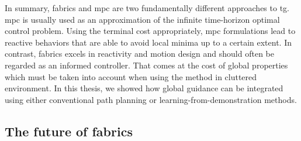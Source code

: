 In summary, \ac{fabrics} and \ac{mpc} are two fundamentally
different approaches to \ac{tg}. \Ac{mpc} is usually used as
an approximation of the infinite time-horizon optimal
control problem. Using the terminal cost appropriately,
\ac{mpc} formulations lead to reactive behaviors that are
able to avoid local minima up to a certain extent. In
contrast, \ac{fabrics} excels in reactivity and motion
design and should often be regarded as an informed
controller. That comes at the cost of global properties
which must be taken into account when using the method in
cluttered environment. In this thesis, we showed how global
guidance can be integrated using either conventional
path planning or learning-from-demonstration methods.

\subsection{The future of \ac{fabrics}}
\label{sec:discussion_limitations_of_fabrics}

